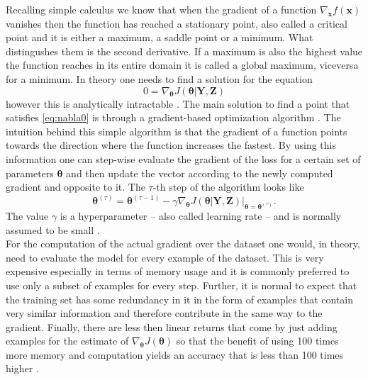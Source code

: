 Recalling simple calculus we know that when the gradient of a function $\nabla_{\bm{x}} f(\bm{x})$ vanishes then the function has reached a stationary point, also called a critical point and it is either a maximum, a saddle point or a minimum. What distingushes them is the second derivative. If a maximum is also the highest value the function reaches in its entire domain it is called a global maximum, viceversa for a minimum. In theory one needs to find a solution for the equation
\begin{equation} \label{eq:nabla0}
    0 = \nabla_{\bm{\theta}}J(\bm{\theta}|\bm{Y},\bm{Z})
\end{equation}
however this is analytically intractable \citep{Bishop2006PatternLearning}. The main solution to find a point that satisfies \cref{eq:nabla0} is through a gradient-based optimization algorithm \citep{Goodfellow2016,Bishop2006PatternLearning}. The intuition behind this simple algorithm is that the gradient of a function points towards the direction where the function increases the fastest. By using this information one can step-wise evaluate the gradient of the loss for a certain set of parameters $\bm{\theta}$ and then update the vector according to the newly computed gradient and opposite to it. The $\tau\text{-th}$ step of the algorithm looks like
\begin{equation} \label{eq:gradientoptim}
    \bm{\theta}^{(\tau)} = \bm{\theta}^{(\tau - 1)} - \gamma \nabla_{\bm{\theta}} J(\bm{\theta}|\bm{Y},\bm{Z}) \bigg|_{\bm{\theta} = \bm{\theta}^{(\tau)}}.
\end{equation}
The value $\gamma$ is a hyperparameter -- also called learning rate -- and is normally assumed to be small \citep{Goodfellow2016,Bishop2006PatternLearning}.\\

For the computation of the actual gradient over the dataset one would, in theory, need to evaluate the model for every example of the dataset. This is very expensive especially in terms of memory usage and it is commonly preferred to use only a subset of examples for every step. Further, it is normal to expect that the training set has some redundancy in it in the form of examples that contain very similar information and therefore contribute in the same way to the gradient. Finally, there are less then linear returns that come by just adding examples for the estimate of $\nabla_{\bm{\theta}} J(\bm{\theta})$ so that the benefit of using 100 times more memory and computation yields an accuracy that is less than 100 times higher \citep{Goodfellow2016}.

